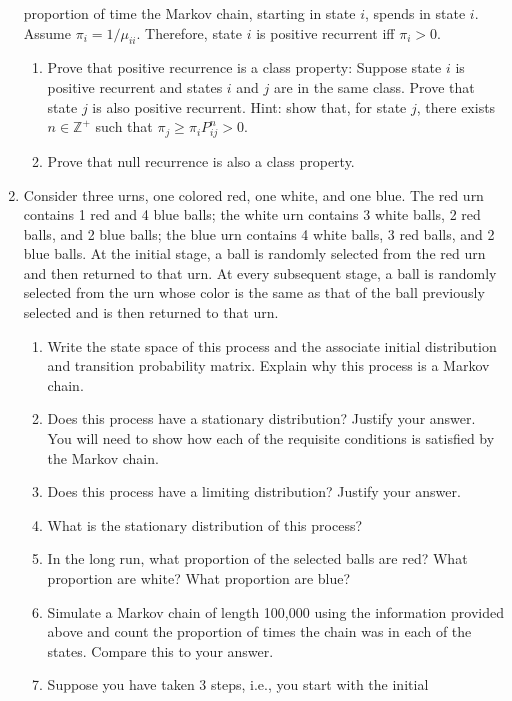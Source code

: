 \documentclass[12pt]{article}
\begin{document}
\begin{enumerate}
  proportion of time the Markov chain, starting in state $i$, spends
  in state $i$. Assume $\pi_i = 1/\mu_{ii}$. Therefore, state $i$ is
  positive recurrent iff $\pi_i>0$. 
\begin{enumerate}
\item Prove that positive recurrence is a class property: Suppose
  state $i$ is positive recurrent and states $i$ and $j$ are in the
  same class.  Prove that state $j$ is also positive recurrent.  Hint:
  show that, for state $j$, there exists $n\in \mathbb{Z}^+$ such that
  $\pi_j \geq \pi_i P_{ij}^n > 0$.
\item Prove that null recurrence is also a class property.
\end{enumerate}
\item Consider three urns, one colored red, one white, and one blue.
  The red urn contains 1 red and 4 blue balls; the white urn contains
  3 white balls, 2 red balls, and 2 blue balls; the blue urn contains
  4 white balls, 3 red balls, and 2 blue balls.  At the initial stage,
  a ball is randomly selected from the red urn and then returned to
  that urn. At every subsequent stage, a ball is randomly selected
  from the urn whose color is the same as that of the ball previously
  selected and is then returned to that urn. 
\begin{enumerate}
\item Write the state space of this process and the associate initial
  distribution and transition probability matrix. Explain why this
  process is a Markov chain.
\item Does this process have a stationary distribution? Justify your
  answer. You will need to show how each of the requisite conditions
 is satisfied by the Markov chain.
\item Does this process have a limiting distribution? Justify your answer.
\item What is the stationary distribution of this process? 
\item In the long run, what proportion of the selected balls are red?
  What proportion are white?  What proportion are blue?
\item Simulate a Markov chain of length 100,000 using the information
  provided above and count the proportion of times the chain was in
  each of the states. Compare this to your answer. 
\item Suppose you have taken 3 steps, i.e., you start with the initial

\end{enumerate}
\end{enumerate}
\end{document}
